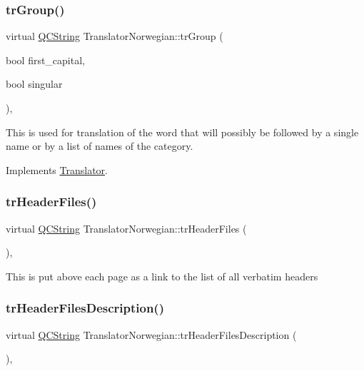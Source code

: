 \subsubsection{\texorpdfstring{trGroup()}{trGroup()}}
{\footnotesize\ttfamily virtual \mbox{\hyperlink{class_q_c_string}{Q\+C\+String}} Translator\+Norwegian\+::tr\+Group (\begin{DoxyParamCaption}\item[{bool}]{first\+\_\+capital,  }\item[{bool}]{singular }\end{DoxyParamCaption})\hspace{0.3cm}{\ttfamily [inline]}, {\ttfamily [virtual]}}

This is used for translation of the word that will possibly be followed by a single name or by a list of names of the category. 

Implements \mbox{\hyperlink{class_translator}{Translator}}.

\mbox{\label{class_translator_norwegian_a112b93cfd3c13f5a7a35806c9898b8ec}} 
\subsubsection{\texorpdfstring{trHeaderFiles()}{trHeaderFiles()}}
{\footnotesize\ttfamily virtual \mbox{\hyperlink{class_q_c_string}{Q\+C\+String}} Translator\+Norwegian\+::tr\+Header\+Files (\begin{DoxyParamCaption}{ }\end{DoxyParamCaption})\hspace{0.3cm}{\ttfamily [inline]}, {\ttfamily [virtual]}}

This is put above each page as a link to the list of all verbatim headers \mbox{\label{class_translator_norwegian_a02d20eaf0e7a21c70f63b89960167130}} 
\subsubsection{\texorpdfstring{trHeaderFilesDescription()}{trHeaderFilesDescription()}}
{\footnotesize\ttfamily virtual \mbox{\hyperlink{class_q_c_string}{Q\+C\+String}} Translator\+Norwegian\+::tr\+Header\+Files\+Description (\begin{DoxyParamCaption}{ }\end{DoxyParamCaption})\hspace{0.3cm}{\ttfamily [inline]}, {\ttfamily [virtual]}}

